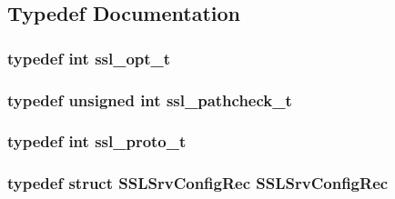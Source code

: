 \subsection{Typedef Documentation}
\subsubsection[{\texorpdfstring{ssl\+\_\+opt\+\_\+t}{ssl_opt_t}}]{\setlength{\rightskip}{0pt plus 5cm}typedef {\bf int} {\bf ssl\+\_\+opt\+\_\+t}}\hypertarget{group__MOD__SSL__PRIVATE_ga8f8f6b4f4f8d30522eb1f6768070dd8a}{}\label{group__MOD__SSL__PRIVATE_ga8f8f6b4f4f8d30522eb1f6768070dd8a}
\subsubsection[{\texorpdfstring{ssl\+\_\+pathcheck\+\_\+t}{ssl_pathcheck_t}}]{\setlength{\rightskip}{0pt plus 5cm}typedef unsigned {\bf int} {\bf ssl\+\_\+pathcheck\+\_\+t}}\hypertarget{group__MOD__SSL__PRIVATE_ga9c80719ccb88e941c1473a4456d662ed}{}\label{group__MOD__SSL__PRIVATE_ga9c80719ccb88e941c1473a4456d662ed}
\subsubsection[{\texorpdfstring{ssl\+\_\+proto\+\_\+t}{ssl_proto_t}}]{\setlength{\rightskip}{0pt plus 5cm}typedef {\bf int} {\bf ssl\+\_\+proto\+\_\+t}}\hypertarget{group__MOD__SSL__PRIVATE_ga5139e7dd6af8f34cd9cf51b9c35312f1}{}\label{group__MOD__SSL__PRIVATE_ga5139e7dd6af8f34cd9cf51b9c35312f1}
\subsubsection[{\texorpdfstring{S\+S\+L\+Srv\+Config\+Rec}{SSLSrvConfigRec}}]{\setlength{\rightskip}{0pt plus 5cm}typedef struct {\bf S\+S\+L\+Srv\+Config\+Rec} {\bf S\+S\+L\+Srv\+Config\+Rec}}\hypertarget{group__MOD__SSL__PRIVATE_ga86434044a97d59875151caecf8b69c55}{}\label{group__MOD__SSL__PRIVATE_ga86434044a97d59875151caecf8b69c55}



